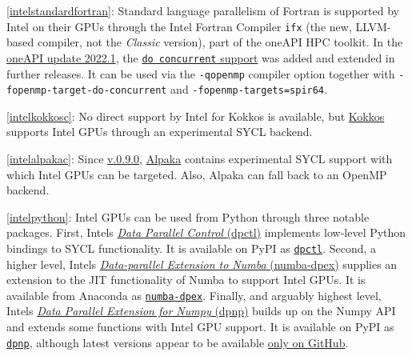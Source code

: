 \item \ref{intelstandardfortran}: Standard language parallelism of Fortran is supported by Intel on their GPUs through the Intel Fortran Compiler \texttt{ifx} (the new, LLVM-based compiler, not the \emph{Classic} version), part of the oneAPI HPC toolkit. In the \href{https://www.intel.com/content/www/us/en/developer/articles/release-notes/fortran-compiler-release-notes.html}{oneAPI update 2022.1}, the \href{https://www.intel.com/content/www/us/en/docs/fortran-compiler/developer-guide-reference/2023-2/do-concurrent.html}{\texttt{do\ concurrent} support} was added and extended in further releases. It can be used via the \texttt{-qopenmp} compiler option together with \texttt{-fopenmp-target-do-concurrent} and \texttt{-fopenmp-targets=spir64}.
\item \ref{intelkokkosc}: No direct support by Intel for Kokkos is available, but \href{https://kokkos.github.io/kokkos-core-wiki/}{Kokkos} supports Intel GPUs through an experimental SYCL backend.
\item \ref{intelalpakac}: Since \href{https://github.com/alpaka-group/alpaka/releases/tag/0.9.0}{v.0.9.0}, \href{https://github.com/alpaka-group/alpaka}{Alpaka} contains experimental SYCL support with which Intel GPUs can be targeted. Also, Alpaka can fall back to an OpenMP backend.
\item \ref{intelpython}: Intel GPUs can be used from Python through three notable packages. First, Intel\textquotesingle s \href{https://github.com/IntelPython/dpctl}{\emph{Data Parallel Control} (dpctl)} implements low-level Python bindings to SYCL functionality. It is available on PyPI as \href{https://pypi.org/project/dpctl/}{\texttt{dpctl}}. Second, a higher level, Intel\textquotesingle s \href{https://github.com/IntelPython/numba-dpex}{\emph{Data-parallel Extension to Numba} (numba-dpex)} supplies an extension to the JIT functionality of Numba to support Intel GPUs. It is available from Anaconda as \href{https://anaconda.org/intel/numba-dpex}{\texttt{numba-dpex}}. Finally, and arguably highest level, Intel\textquotesingle s \href{https://github.com/IntelPython/dpnp}{\emph{Data Parallel Extension for Numpy} (dpnp)} builds up on the Numpy API and extends some functions with Intel GPU support. It is available on PyPI as \href{https://pypi.org/project/dpnp/}{\texttt{dpnp}}, although latest versions appear to be available \href{https://github.com/IntelPython/dpnp/releases}{only on GitHub}.
